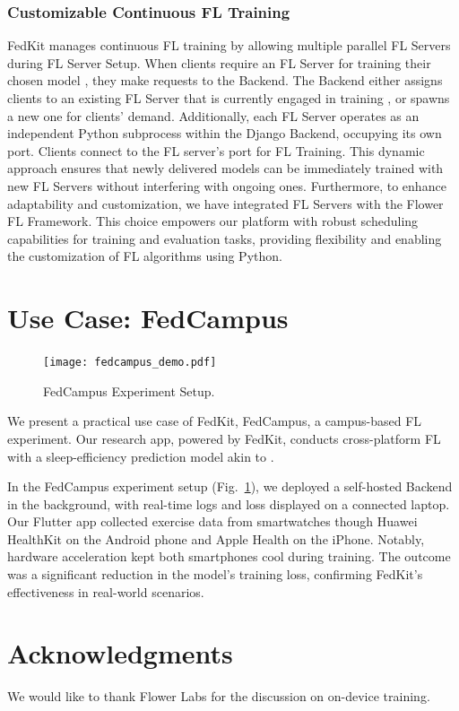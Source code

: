 \documentclass[letterpaper]{article} %
\begin{document}
\subsubsection{Customizable Continuous FL Training}
FedKit manages continuous FL training by allowing multiple parallel FL Servers
during FL Server Setup.
When clients require an FL Server for
training their chosen model \model{}, they make requests to the Backend.
The Backend either assigns clients to an existing FL Server \fs{} that
is currently engaged in training \model{},
or spawns a new one for clients' demand.
Additionally, each FL Server \fs{}
operates as an independent Python subprocess within the Django Backend,
occupying its own port.
Clients connect to the FL server's port for FL Training.
This dynamic approach ensures that
newly delivered models can be immediately trained with new FL Servers
without interfering with ongoing ones.
Furthermore, to enhance adaptability and customization, we have integrated FL Servers with the Flower FL Framework. This choice empowers our platform with robust scheduling capabilities for training and evaluation tasks, providing flexibility and enabling the customization of FL algorithms using Python.


\section{Use Case: FedCampus}

\begin{figure}
    \centering
    \texttt{[image: fedcampus\_demo.pdf]}
    \caption{FedCampus Experiment Setup.}
    \label{fig:fedcampus}
\end{figure}

We present a practical use case of FedKit, FedCampus,
a campus-based FL experiment.
Our research app, powered by FedKit,
conducts cross-platform FL with a sleep-efficiency prediction model
akin to \cite{khoa2022fedmcrnn}.

In the FedCampus experiment setup (Fig.~\ref{fig:fedcampus}),
we deployed a self-hosted Backend in the background,
with real-time logs and loss displayed on a connected laptop.
Our Flutter app collected exercise data from smartwatches
though Huawei HealthKit on the Android phone and Apple Health on the iPhone.
Notably, hardware acceleration kept both smartphones cool during training.
The outcome was a significant reduction in the model's training loss,
confirming FedKit's effectiveness in real-world scenarios.

\appendix

\section*{Acknowledgments}
We would like to thank Flower Labs for the discussion on on-device training.

\bigskip


\end{document}
